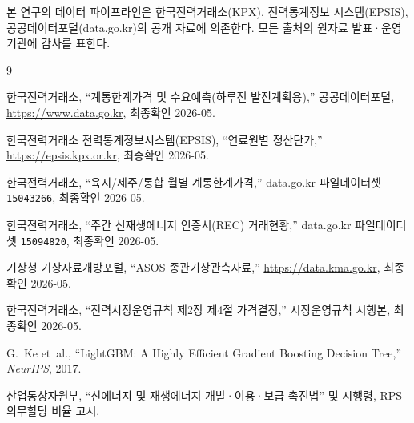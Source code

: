 \documentclass[11pt,a4paper]{article}
\begin{document}
본 연구의 데이터 파이프라인은 한국전력거래소(KPX), 전력통계정보
시스템(EPSIS), 공공데이터포털(data.go.kr)의 공개 자료에 의존한다.
모든 출처의 원자료 발표·운영 기관에 감사를 표한다.

\begin{thebibliography}{9}

한국전력거래소, ``계통한계가격 및 수요예측(하루전 발전계획용),''
공공데이터포털, \url{https://www.data.go.kr}, 최종확인 2026-05.

한국전력거래소 전력통계정보시스템(EPSIS), ``연료원별 정산단가,''
\url{https://epsis.kpx.or.kr}, 최종확인 2026-05.

한국전력거래소, ``육지/제주/통합 월별 계통한계가격,''
data.go.kr 파일데이터셋 \texttt{15043266}, 최종확인 2026-05.

한국전력거래소, ``주간 신재생에너지 인증서(REC) 거래현황,''
data.go.kr 파일데이터셋 \texttt{15094820}, 최종확인 2026-05.

기상청 기상자료개방포털, ``ASOS 종관기상관측자료,''
\url{https://data.kma.go.kr}, 최종확인 2026-05.

한국전력거래소, ``전력시장운영규칙 제2장 제4절 가격결정,''
시장운영규칙 시행본, 최종확인 2026-05.

G.~Ke et~al., ``LightGBM: A Highly Efficient Gradient Boosting Decision
Tree,'' \emph{NeurIPS}, 2017.

산업통상자원부, ``신에너지 및 재생에너지 개발·이용·보급 촉진법''
및 시행령, RPS 의무할당 비율 고시.

\end{thebibliography}
\end{document}
